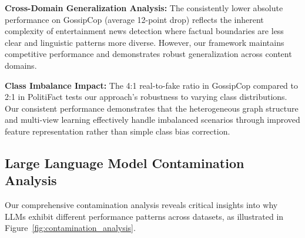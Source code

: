 \textbf{Cross-Domain Generalization Analysis:} The consistently lower absolute performance on GossipCop (average 12-point drop) reflects the inherent complexity of entertainment news detection where factual boundaries are less clear and linguistic patterns more diverse. However, our framework maintains competitive performance and demonstrates robust generalization across content domains.

\textbf{Class Imbalance Impact:} The 4:1 real-to-fake ratio in GossipCop compared to 2:1 in PolitiFact tests our approach's robustness to varying class distributions. Our consistent performance demonstrates that the heterogeneous graph structure and multi-view learning effectively handle imbalanced scenarios through improved feature representation rather than simple class bias correction.

\subsection{Large Language Model Contamination Analysis}

Our comprehensive contamination analysis reveals critical insights into why LLMs exhibit different performance patterns across datasets, as illustrated in Figure~\ref{fig:contamination_analysis}.

